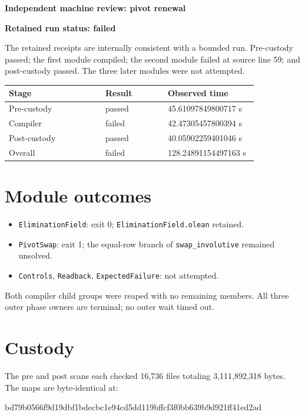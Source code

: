 \documentclass[10pt]{article}
\begin{document}
{\LARGE\bfseries Independent machine review: pivot renewal}\par
{\large\bfseries\color{fail} Retained run status: failed}\par

The retained receipts are internally consistent with a bounded run. Pre-custody passed; the first module compiled; the second module failed at source line 59; and post-custody passed. The three later modules were not attempted.

\begin{center}
\begin{tabular}{>{\raggedright\arraybackslash}p{0.34\linewidth}p{0.22\linewidth}p{0.28\linewidth}}
\toprule
\textbf{Stage} & \textbf{Result} & \textbf{Observed time}\\
\midrule
Pre-custody & passed & 45.61097849800717 s\\
Compiler & failed & 42.47305457800394 s\\
Post-custody & passed & 40.05902259401046 s\\
Overall & failed & 128.24891154497163 s\\
\bottomrule
\end{tabular}
\end{center}

\section*{Module outcomes}
\begin{itemize}[leftmargin=1.4em,itemsep=2pt]
\item \texttt{EliminationField}: exit 0; \texttt{EliminationField.olean} retained.
\item \texttt{PivotSwap}: exit 1; the equal-row branch of \texttt{swap\_involutive} remained unsolved.
\item \texttt{Controls}, \texttt{Readback}, \texttt{ExpectedFailure}: not attempted.
\end{itemize}

Both compiler child groups were reaped with no remaining members. All three outer phase owners are terminal; no outer wait timed out.

\section*{Custody}
The pre and post scans each checked 16,736 files totaling 3,111,892,318 bytes. The maps are byte-identical at:

{\footnotesize\ttfamily bd79b0566f9d19dbf1bdecbc1e94cd5dd119bffcf3f0bb639b9d921ff41ed2ad}
\end{document}
